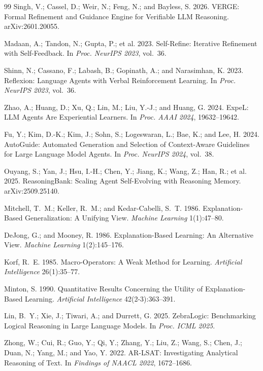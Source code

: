 \documentclass[UTF8,a4paper,12pt]{ctexart}
\begin{document}
\begin{thebibliography}{99}
Singh, V.; Cassel, D.; Weir, N.; Feng, N.; and Bayless, S. 2026.
VERGE: Formal Refinement and Guidance Engine for Verifiable LLM Reasoning.
arXiv:2601.20055.

Madaan, A.; Tandon, N.; Gupta, P.; et al. 2023.
Self-Refine: Iterative Refinement with Self-Feedback.
In \textit{Proc. NeurIPS 2023}, vol.~36.

Shinn, N.; Cassano, F.; Labash, B.; Gopinath, A.; and Narasimhan, K. 2023.
Reflexion: Language Agents with Verbal Reinforcement Learning.
In \textit{Proc. NeurIPS 2023}, vol.~36.

Zhao, A.; Huang, D.; Xu, Q.; Lin, M.; Liu, Y.-J.; and Huang, G. 2024.
ExpeL: LLM Agents Are Experiential Learners.
In \textit{Proc. AAAI 2024}, 19632--19642.

Fu, Y.; Kim, D.-K.; Kim, J.; Sohn, S.; Logeswaran, L.; Bae, K.; and Lee, H. 2024.
AutoGuide: Automated Generation and Selection of Context-Aware Guidelines for Large Language Model Agents.
In \textit{Proc. NeurIPS 2024}, vol.~38.

Ouyang, S.; Yan, J.; Hsu, I.-H.; Chen, Y.; Jiang, K.; Wang, Z.; Han, R.; et al. 2025.
ReasoningBank: Scaling Agent Self-Evolving with Reasoning Memory.
arXiv:2509.25140.

Mitchell, T.~M.; Keller, R.~M.; and Kedar-Cabelli, S.~T. 1986.
Explanation-Based Generalization: A Unifying View.
\textit{Machine Learning} 1(1):47--80.

DeJong, G.; and Mooney, R. 1986.
Explanation-Based Learning: An Alternative View.
\textit{Machine Learning} 1(2):145--176.

Korf, R.~E. 1985. Macro-Operators: A Weak Method for Learning.
\textit{Artificial Intelligence} 26(1):35--77.

Minton, S. 1990. Quantitative Results Concerning the Utility of Explanation-Based Learning.
\textit{Artificial Intelligence} 42(2-3):363--391.

Lin, B.~Y.; Xie, J.; Tiwari, A.; and Durrett, G. 2025.
ZebraLogic: Benchmarking Logical Reasoning in Large Language Models.
In \textit{Proc. ICML 2025}.

Zhong, W.; Cui, R.; Guo, Y.; Qi, Y.; Zhang, Y.; Liu, Z.; Wang, S.; Chen, J.; Duan, N.; Yang, M.; and Yao, Y. 2022.
AR-LSAT: Investigating Analytical Reasoning of Text.
In \textit{Findings of NAACL 2022}, 1672--1686.


\end{thebibliography}
\end{document}
